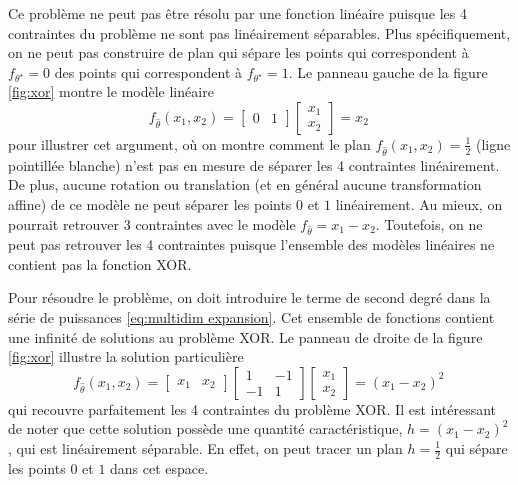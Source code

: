 Ce problème ne peut pas être résolu par une fonction linéaire puisque les 4 contraintes du problème ne sont pas linéairement séparables.
Plus spécifiquement, on ne peut pas construire de plan qui sépare les points qui correspondent à $f_{\theta^{\star}} = 0$ des points 
qui correspondent à $f_{\theta^{\star}} = 1$. Le panneau gauche de la figure \ref{fig:xor} montre le modèle linéaire
\begin{equation}\label{eq:sol1}
        f_{\hat{\theta}}(x_1, x_2) = \begin{bmatrix}0 & 1 \end{bmatrix} \begin{bmatrix} x_1 \\ x_2 \end{bmatrix} = x_2\, 
\end{equation}
pour illustrer cet argument, où on montre comment le plan $f_{\hat{\theta}}(x_1, x_2) = \frac{1}{2}$ (ligne pointillée blanche) 
n'est pas en mesure de séparer les 4 contraintes linéairement.
De plus, aucune rotation ou translation (et en général aucune transformation affine) de ce modèle 
ne peut séparer les points $0$ et $1$ linéairement. 
Au mieux, on pourrait retrouver 3 contraintes avec le modèle $f_{\hat{\theta}} = x_1 - x_2$. Toutefois, on ne peut pas retrouver 
les 4 contraintes puisque l'ensemble des modèles linéaires ne contient pas la fonction XOR.

Pour résoudre le problème, on doit introduire le terme de second degré dans la série de puissances \eqref{eq:multidim expansion}. 
Cet ensemble de fonctions contient une infinité de solutions au problème XOR. Le panneau de droite de la figure \ref{fig:xor} 
illustre la solution particulière
\begin{equation}\label{eq:sol quad}
        f_{\hat{\theta}}(x_1, x_2) = \begin{bmatrix} x_1 & x_2 \end{bmatrix} \begin{bmatrix} 1 & -1 \\ -1 & 1 \end{bmatrix} \begin{bmatrix} x_1 \\ x_2 \end{bmatrix} = (x_1 - x_2)^2\,
\end{equation} 
qui recouvre parfaitement les 4 contraintes du problème XOR. Il est intéressant de noter que 
cette solution possède une quantité caractéristique, $h = (x_1 - x_2)^2$, qui est linéairement séparable. En effet, 
on peut tracer un plan $h = \frac{1}{2}$ qui sépare les points $0$ et $1$ dans cet espace. 

